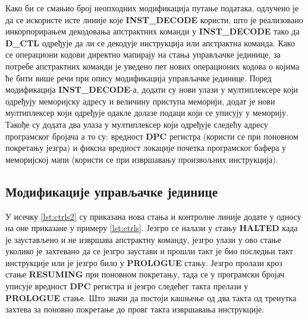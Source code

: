 Како би се смањио број неопходних модификација путање података, одлучено је да се искористе исте линије које \textbf{INST\_DECODE} користи, што је реализовано инкорпорирањем декодовања апстрактних команди у \textbf{INST\_DECODE} тако да \textbf{D\_CTL} одређује да ли се декодује инструкција или апстрактна команда. Како се операциони кодови директно мапирају на стања управљачке јединице, за потребе апстрактних команди је уведено пет нових операционих кодова о којима ће бити више речи при опису модификација управљачке јединице.
Поред модификација \textbf{INST\_DECODE}-а, додати су нови улази у мултиплексере који одређују меморијску адресу и величину приступа меморији, додат је нови мултиплексер који одређује одакле долазе подаци који се уписују у меморију. Такође су додата два улаза у мултиплексер који одређује следећу адресу програмског бројача а то су: вредност \textbf{\acrshort{DPC}} регистра (користи се при поновном покретању језгра) и фиксна вредност локације почетка програмског бафера у меморијској мапи (користи се при извршавању произвољних инструкција).

\subsection{Модификације управљачке јединице}

У исечку \ref{lst:ctrls2} су приказана нова стања и контролне линије додате у односу на оне приказане у примеру \ref{lst:ctrls}.
Језгро се налази у стању \textbf{HALTED} када је заустављено и не извршава апстрактну команду, језгро улази у ово стање уколико је захтевано да се језгро заустави и прошли такт је био последњи такт инструкције или је језгро било у \textbf{PROLOGUE} стању. Језгро пролази кроз стање \textbf{RESUMING} при поновном покретању, тада се у програмски бројач уписује вредност \textbf{\acrshort{DPC}} регистра и језгро следећег такта прелази у \textbf{PROLOGUE} стање. Што значи да постоји кашњење од два такта од тренутка захтева за поновно покретање до провг такта извршавања инструкције.




